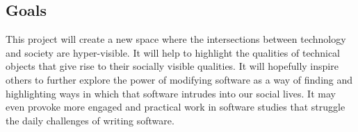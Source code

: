 \documentclass[a4paper,man,natbib]{apa6}
\begin{document}
   \subsection*{Goals}
   This project will create a new space where the intersections between technology and society are hyper-visible. It will help to highlight the qualities of technical objects that give rise to their socially visible qualities. It will hopefully inspire others to further explore the power of modifying software as a way of finding and highlighting ways in which that software intrudes into our social lives. It may even provoke more engaged and practical work in software studies that struggle the daily challenges of writing software.

   \newpage
   \printnoidxglossaries

   \newpage
   \setlength{\parindent}{4em}
   
\end{document}
